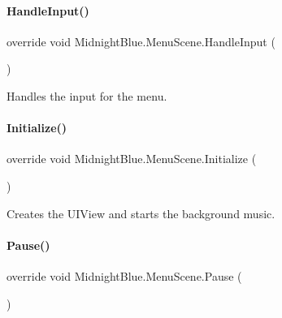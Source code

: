 \hypertarget{class_midnight_blue_1_1_menu_scene_a34d30a2b66e9eadbf0889071bca6fa57}{}\label{class_midnight_blue_1_1_menu_scene_a34d30a2b66e9eadbf0889071bca6fa57} 
\paragraph{\texorpdfstring{Handle\+Input()}{HandleInput()}}
{\footnotesize\ttfamily override void Midnight\+Blue.\+Menu\+Scene.\+Handle\+Input (\begin{DoxyParamCaption}{ }\end{DoxyParamCaption})\hspace{0.3cm}{\ttfamily [inline]}}



Handles the input for the menu. 

\hypertarget{class_midnight_blue_1_1_menu_scene_ab46d90617acf2fad0a3c759337c54aaf}{}\label{class_midnight_blue_1_1_menu_scene_ab46d90617acf2fad0a3c759337c54aaf} 
\paragraph{\texorpdfstring{Initialize()}{Initialize()}}
{\footnotesize\ttfamily override void Midnight\+Blue.\+Menu\+Scene.\+Initialize (\begin{DoxyParamCaption}{ }\end{DoxyParamCaption})\hspace{0.3cm}{\ttfamily [inline]}}



Creates the U\+I\+View and starts the background music. 

\hypertarget{class_midnight_blue_1_1_menu_scene_a7a2f8875f949d2ec2e6f3a8c6da7cedf}{}\label{class_midnight_blue_1_1_menu_scene_a7a2f8875f949d2ec2e6f3a8c6da7cedf} 
\paragraph{\texorpdfstring{Pause()}{Pause()}}
{\footnotesize\ttfamily override void Midnight\+Blue.\+Menu\+Scene.\+Pause (\begin{DoxyParamCaption}{ }\end{DoxyParamCaption})\hspace{0.3cm}{\ttfamily [inline]}}



